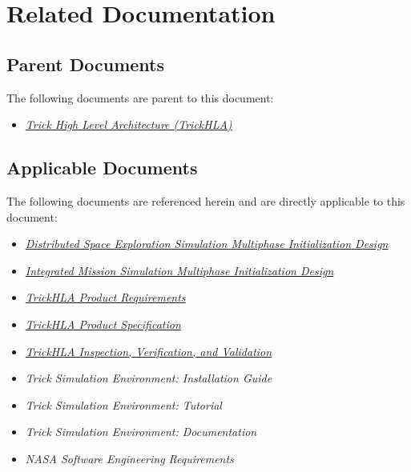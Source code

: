 \chapter{Related Documentation}\label{sec:docs}

\section{Parent Documents}
The following documents are parent to this document:

\begin{itemize}
\item{\href{file:\TRICKHLAHOME/docs/TrickHLA.pdf}
           {\em Trick High Level Architecture (TrickHLA)}}
\cite{trickhlaenv:TrickHLA}
\end{itemize}

\section{Applicable Documents}
The following documents are referenced herein and are directly
applicable to this document:

\begin{itemize}
\item{\href{file:DSES_Multiphase_Init_Design_Document.pdf}
           {\em Distributed Space Exploration Simulation Multiphase Initialization Design}}
\cite{trickhlaenv:DSES-multiphase-init-design}

\item{\href{file:IMSim_Multiphase_Init_Design_Document.pdf}
           {\em Integrated Mission Simulation Multiphase Initialization Design}}
\cite{trickhlaenv:IMSim-multiphase-init-design}

\item{\href{file:TrickHLAReqt.pdf}
           {\em TrickHLA Product Requirements}}
\cite{trickhlaenv:TrickHLAReqt}

\item{\href{file:TrickHLASpec.pdf}
           {\em TrickHLA Product Specification}}
\cite{trickhlaenv:TrickHLASpec}

\item{\href{file:TrickHLAIVV.pdf}
           {\em TrickHLA Inspection, Verification, and Validation}}
\cite{trickhlaenv:TrickHLAIVV}

\item{\em Trick Simulation Environment: Installation Guide}
\cite{Trick:Install}

\item{\em Trick Simulation Environment: Tutorial}
\cite{Trick:Tutorial}

\item{\em Trick Simulation Environment: Documentation}
\cite{Trick:Documentation}

\item{\em NASA Software Engineering Requirements}
\cite{NASA:SWE}

\end{itemize}

